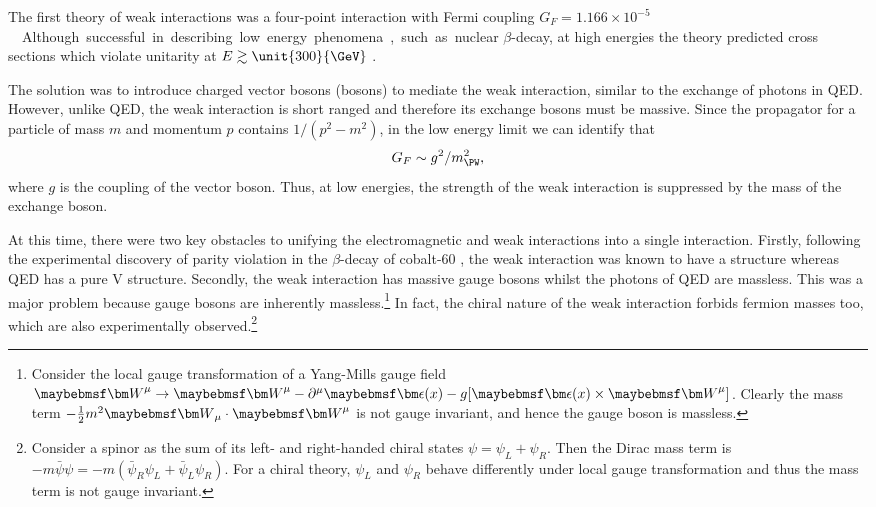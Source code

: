 
The first theory of weak interactions was a four-point interaction with Fermi coupling 
\unit{$G_F = 1.166\times 10^{-5}$}{\GeV\rpsquared}. Although successful in describing low energy phenomena, such as nuclear $\beta$-decay, at high energies the theory predicted cross sections which violate unitarity at $E \gtrsim \unit{300}{\GeV}$ 
\cite{Aitchison}.

The solution was to introduce charged vector bosons (\PWpm bosons) to mediate the weak 
interaction, similar to the exchange of photons in \ac{QED}. However, unlike \ac{QED}, 
the weak interaction is short ranged and therefore its exchange bosons must be massive. 
Since the propagator for a particle of mass $m$ and momentum $p$ contains 
$1 / (p^2 - m^2)$, in the low energy limit we can identify that
\begin{equation}
	G_F \sim g^2 / m_{\PW}^2 ,
\end{equation}
where $g$ is the coupling of the vector boson. Thus, at low energies, the strength of the weak interaction is suppressed by the mass of the exchange boson.

At this time, there were two key obstacles to unifying the electromagnetic and weak 
interactions into a single interaction. Firstly, following the experimental discovery of 
parity violation in the $\beta$-decay of cobalt-60 \cite{Wu:1957}, the weak interaction
was known to have a \VminusA structure whereas \ac{QED} has a pure V structure. 
Secondly, the weak interaction has massive gauge bosons whilst the photons of \ac{QED} are 
massless. This was a major problem because gauge bosons are inherently massless.\footnote{
	Consider the local gauge transformation of a Yang-Mills gauge field 
	$\bvec{W}^{\mu} \rightarrow \bvec{W}^{\mu} - \partial^{\mu} \bvec{\epsilon}(x)
	- g \lbrack \bvec{\epsilon}(x) \times \bvec{W}^{\mu} \rbrack$. Clearly the mass term 
	$-\tfrac{1}{2}m^2 \bvec{W}_{\mu} \cdot \bvec{W}^{\mu}$ is not gauge invariant, and 
	hence the gauge boson is massless.}
In fact, the chiral nature of the weak interaction forbids fermion masses too, which are
also experimentally observed.\footnote{
	Consider a spinor as the sum of its left- and right-handed chiral states 
	$\psi = \psi_L + \psi_R$. Then the Dirac mass term is $-m \bar{\psi} \psi = 
	-m (\bar{\psi}_R \psi_L + \bar{\psi}_L \psi_R)$. For a chiral theory, $\psi_L$ and
	$\psi_R$ behave differently under local gauge transformation and thus the mass term is not gauge invariant.
}


